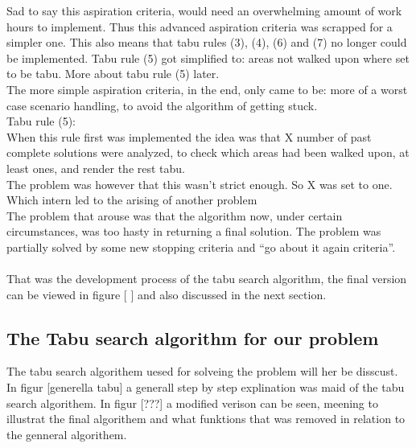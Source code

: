 Sad to say this aspiration criteria, would need an overwhelming amount of work hours to implement. Thus this advanced aspiration criteria was scrapped for a simpler one. This also means that tabu rules (3), (4), (6) and (7) no longer could be implemented. Tabu rule (5) got simplified to: areas not walked upon where set to be tabu. More about tabu rule (5) later.\\
The more simple aspiration criteria, in the end, only came to be: more of a worst case scenario handling, to avoid the algorithm of getting stuck.\\
Tabu rule (5):\\
When this rule first was implemented the idea was that X number of past complete solutions were analyzed, to check which areas had been walked upon, at least ones, and render the rest tabu.\\
The problem was however that this wasn’t strict enough. So X was set to one. Which intern led to the arising of another problem\\
The problem that arouse was that the algorithm now, under certain circumstances, was too hasty in returning a final solution.
The problem was partially solved by some new stopping criteria and “go about it again criteria”.\\
\\
That was the development process of the tabu search algorithm, the final version can be viewed in figure [ ] and also discussed in the next section.\\
\subsection{The Tabu search algorithm for our problem}

The tabu search algorithem uesed for solveing the problem will her be disscust.\\
In figur [generella tabu] a generall step by step explination was maid of the tabu search algorithem. In figur [???] a modified verison can be seen, meening to illustrat the final algorithem and what funktions that was removed in relation to the genneral algorithem.\\


